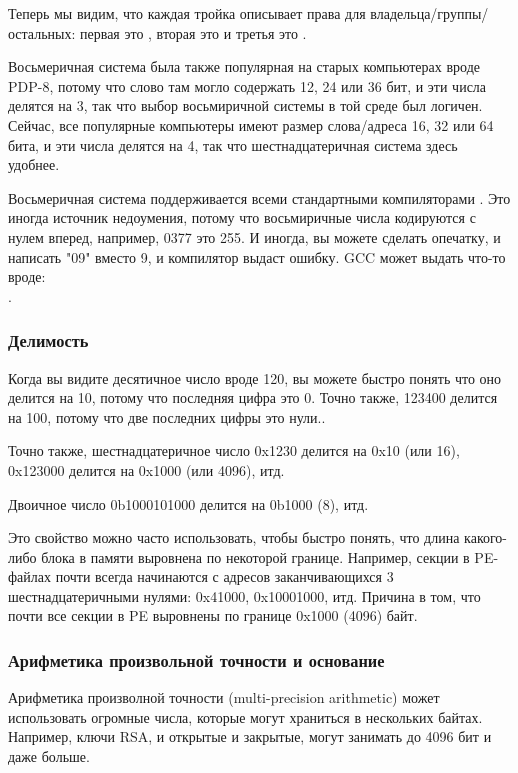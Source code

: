 Теперь мы видим, что каждая тройка описывает права для владельца/группы/остальных:
первая это , вторая это  и третья это .

Восьмеричная система была также популярная на старых компьютерах вроде PDP-8, потому что слово там могло содержать 12, 24 или
36 бит, и эти числа делятся на 3, так что выбор восьмиричной системы в той среде был логичен.
Сейчас, все популярные компьютеры имеют размер слова/адреса 16, 32 или 64 бита, и эти числа делятся на 4,
так что шестнадцатеричная система здесь удобнее.

Восьмеричная система поддерживается всеми стандартными компиляторами \CCpp{}.
Это иногда источник недоумения, потому что восьмиричные числа кодируются с нулем вперед, например, 0377 это 255.
И иногда, вы можете сделать опечатку, и написать "09" вместо 9, и компилятор выдаст ошибку.
GCC может выдать что-то вроде:\\
.

\subsubsection{Делимость}

Когда вы видите десятичное число вроде 120, вы можете быстро понять что оно делится на 10, потому что последняя цифра это 0.
Точно также, 123400 делится на 100, потому что две последних цифры это нули..

Точно также, шестнадцатеричное число 0x1230 делится на 0x10 (или 16), 0x123000 делится на 0x1000 (или 4096), итд.

Двоичное число 0b1000101000 делится на 0b1000 (8), итд.

Это свойство можно часто использовать, чтобы быстро понять,
что длина какого-либо блока в памяти выровнена по некоторой границе.
Например, секции в \ac{PE}-файлах почти всегда начинаются с адресов заканчивающихся 3 шестнадцатеричными нулями:
0x41000, 0x10001000, итд.
Причина в том, что почти все секции в \ac{PE} выровнены по границе 0x1000 (4096) байт.

\subsubsection{Арифметика произвольной точности и основание}

Арифметика произволной точности (multi-precision arithmetic) может использовать огромные числа,
которые могут храниться в нескольких байтах.
Например, ключи RSA, и открытые и закрытые, могут занимать до 4096 бит и даже больше.

